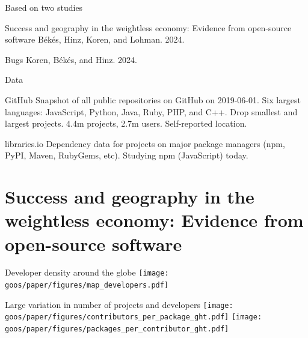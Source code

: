 \documentclass[
  ignorenonframetext,
  aspectratio=1610,
]{beamer}
\begin{document}
\begin{frame}{Based on two studies}
\label{based-on-two-studies}
\begin{block}{Success and geography in the weightless economy: Evidence
from open-source software}
\label{success-and-geography-in-the-weightless-economy-evidence-from-open-source-software}
Békés, Hinz, Koren, and Lohman. 2024.
\end{block}

\begin{block}{Bugs }
\label{bugs}
Koren, Békés, and Hinz. 2024.
\end{block}
\end{frame}

\begin{frame}{Data}
\label{data}
\begin{block}{GitHub}
\label{github}
Snapshot of all public repositories on GitHub on 2019-06-01. Six largest
languages: JavaScript, Python, Java, Ruby, PHP, and C++. Drop smallest
and largest projects. 4.4m projects, 2.7m users. Self-reported location.
\end{block}

\begin{block}{libraries.io}
\label{libraries.io}
Dependency data for projects on major package managers (npm, PyPI,
Maven, RubyGems, etc). Studying npm (JavaScript) today.
\end{block}
\end{frame}

\section{Success and geography in the weightless economy: Evidence from
open-source
software}\label{success-and-geography-in-the-weightless-economy-evidence-from-open-source-software-1}

\begin{frame}{Developer density around the globe}
\label{developer-density-around-the-globe}
\texttt{[image: goos/paper/figures/map\_developers.pdf]}
\end{frame}

\begin{frame}{Large variation in number of projects and developers}
\label{large-variation-in-number-of-projects-and-developers}
\texttt{[image: goos/paper/figures/contributors\_per\_package\_ght.pdf]}
\texttt{[image: goos/paper/figures/packages\_per\_contributor\_ght.pdf]}
\end{frame}
\end{document}
